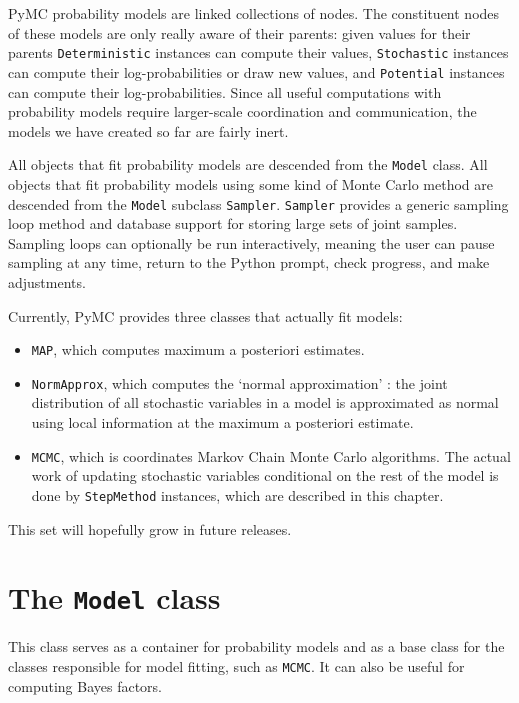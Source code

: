 PyMC probability models are linked collections of nodes. The constituent nodes of these models are only really aware of their parents: given values for their parents \texttt{Deterministic} instances can compute their values, \texttt{Stochastic} instances can compute their log-probabilities or draw new values, and \texttt{Potential} instances can compute their log-probabilities. Since all useful computations with probability models require larger-scale coordination and communication, the models we have created so far are fairly inert.

All objects that fit probability models are descended from the \texttt{Model} class. All objects that fit probability models using some kind of Monte Carlo method are descended from the \texttt{Model} subclass \texttt{Sampler}. \texttt{Sampler} provides a generic sampling loop method and database support for storing large sets of joint samples. Sampling loops can optionally be run interactively, meaning the user can pause sampling at any time, return to the Python prompt, check progress, and make adjustments.

Currently, PyMC provides three classes that actually fit models:
\begin{itemize}
    \item \texttt{MAP}, which computes maximum a posteriori estimates.
    \item \texttt{NormApprox}, which computes the `normal approximation' \cite{gelman}: the joint distribution of all stochastic variables in a model is approximated as normal using local information at the maximum a posteriori estimate.
    \item \texttt{MCMC}, which is coordinates Markov Chain Monte Carlo algorithms. The actual work of updating stochastic variables conditional on the rest of the model is done by \texttt{StepMethod} instances, which are described in this chapter.
\end{itemize}
This set will hopefully grow in future releases. 



\section{The \texttt{Model} class} \label{sec:Model}
This class serves as a container for probability models and as a base class for the classes responsible for model fitting, such as \texttt{MCMC}. It can also be useful for computing Bayes factors.

